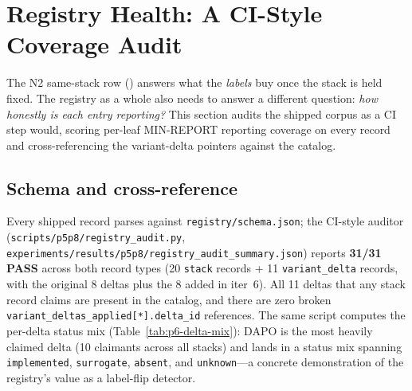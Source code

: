\section{Registry Health: A CI-Style Coverage Audit}
\label{sec:p6-health}

The N2 same-stack row () answers what the
\emph{labels} buy once the stack is held fixed. The registry as a whole
also needs to answer a different question: \emph{how honestly is each
entry reporting?} This section audits the shipped corpus as a CI step
would, scoring per-leaf MIN-REPORT reporting coverage on every record
and cross-referencing the variant-delta pointers against the catalog.

\subsection{Schema and cross-reference}
Every shipped record parses against \texttt{registry/schema.json}; the
CI-style auditor (\texttt{scripts/p5p8/registry\_audit.py},
\texttt{experiments/results/p5p8/registry\_audit\_summary.json})
reports \textbf{31/31 PASS} across both record types (20 \texttt{stack}
records + 11 \texttt{variant\_delta} records, with the original 8
deltas plus the 8 added in iter~6). All 11 deltas that any stack record
claims are present in the catalog, and there are zero broken
\texttt{variant\_deltas\_applied[*].delta\_id} references. The same
script computes the per-delta status mix
(Table~\ref{tab:p6-delta-mix}): DAPO is the most heavily claimed delta
(10 claimants across all stacks) and lands in a status mix spanning
\texttt{implemented}, \texttt{surrogate}, \texttt{absent}, and
\texttt{unknown}---a concrete demonstration of the registry's value as a
label-flip detector.

